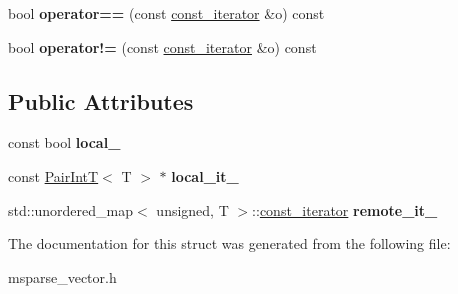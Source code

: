 \begin{DoxyCompactItemize}
\item 
\mbox{\label{structcpyp_1_1_sparse_vector_1_1const__iterator_a65a183496865f39d513560ad4e2723f9}} 
bool {\bfseries operator==} (const \mbox{\hyperlink{structcpyp_1_1_sparse_vector_1_1const__iterator}{const\+\_\+iterator}} \&o) const
\item 
\mbox{\label{structcpyp_1_1_sparse_vector_1_1const__iterator_a4e0e306232b0c6478b2d3e553da10791}} 
bool {\bfseries operator!=} (const \mbox{\hyperlink{structcpyp_1_1_sparse_vector_1_1const__iterator}{const\+\_\+iterator}} \&o) const
\end{DoxyCompactItemize}
\subsection*{Public Attributes}
\begin{DoxyCompactItemize}
\item 
\mbox{\label{structcpyp_1_1_sparse_vector_1_1const__iterator_a035d48930999f94b3b34f7f67bc51677}} 
const bool {\bfseries local\+\_\+}
\item 
\mbox{\label{structcpyp_1_1_sparse_vector_1_1const__iterator_ace92f718f92bb30483f15b0024d96981}} 
const \mbox{\hyperlink{structcpyp_1_1_pair_int_t}{Pair\+IntT}}$<$ T $>$ $\ast$ {\bfseries local\+\_\+it\+\_\+}
\item 
\mbox{\label{structcpyp_1_1_sparse_vector_1_1const__iterator_aa7a5e6fde6da1f2fce7e4afe763a80cd}} 
std\+::unordered\+\_\+map$<$ unsigned, T $>$\+::\mbox{\hyperlink{structcpyp_1_1_sparse_vector_1_1const__iterator}{const\+\_\+iterator}} {\bfseries remote\+\_\+it\+\_\+}
\end{DoxyCompactItemize}


The documentation for this struct was generated from the following file\+:\begin{DoxyCompactItemize}
\item 
msparse\+\_\+vector.\+h\end{DoxyCompactItemize}
